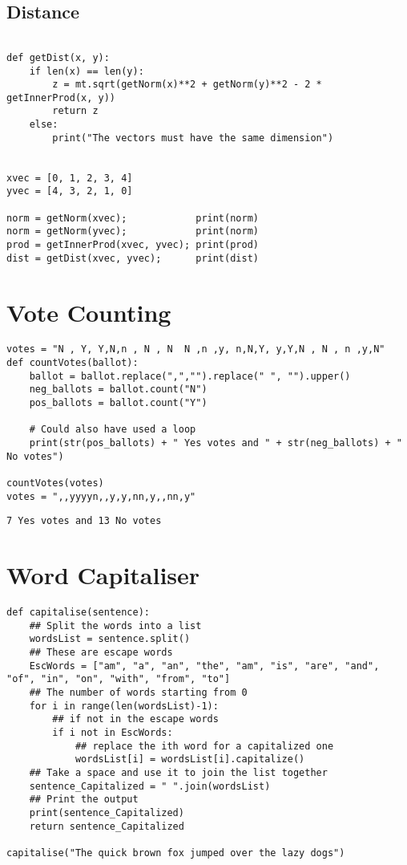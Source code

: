 \documentclass[11pt]{article}
\begin{document}
\subsection{Distance}
\label{sec:orgd4ca3fa}
\begin{verbatim}

def getDist(x, y):
    if len(x) == len(y):
        z = mt.sqrt(getNorm(x)**2 + getNorm(y)**2 - 2 * getInnerProd(x, y))
        return z
    else:
        print("The vectors must have the same dimension")


xvec = [0, 1, 2, 3, 4]
yvec = [4, 3, 2, 1, 0]

norm = getNorm(xvec);            print(norm)
norm = getNorm(yvec);            print(norm)
prod = getInnerProd(xvec, yvec); print(prod)
dist = getDist(xvec, yvec);      print(dist)

\end{verbatim}

\section{Vote Counting}
\label{sec:org044ba30}

\begin{verbatim}
votes = "N , Y, Y,N,n , N , N  N ,n ,y, n,N,Y, y,Y,N , N , n ,y,N"
def countVotes(ballot):
    ballot = ballot.replace(",","").replace(" ", "").upper()
    neg_ballots = ballot.count("N")
    pos_ballots = ballot.count("Y")

    # Could also have used a loop
    print(str(pos_ballots) + " Yes votes and " + str(neg_ballots) + " No votes")

countVotes(votes)
votes = ",,yyyyn,,y,y,nn,y,,nn,y"
\end{verbatim}

\begin{verbatim}
7 Yes votes and 13 No votes
\end{verbatim}

\section{Word Capitaliser}
\label{sec:org1ba727f}
\begin{verbatim}
def capitalise(sentence):
    ## Split the words into a list
    wordsList = sentence.split()
    ## These are escape words
    EscWords = ["am", "a", "an", "the", "am", "is", "are", "and", "of", "in", "on", "with", "from", "to"]
    ## The number of words starting from 0
    for i in range(len(wordsList)-1):
        ## if not in the escape words
        if i not in EscWords:
            ## replace the ith word for a capitalized one
            wordsList[i] = wordsList[i].capitalize()
    ## Take a space and use it to join the list together
    sentence_Capitalized = " ".join(wordsList)
    ## Print the output
    print(sentence_Capitalized)
    return sentence_Capitalized

capitalise("The quick brown fox jumped over the lazy dogs")
\end{verbatim}
\end{document}
